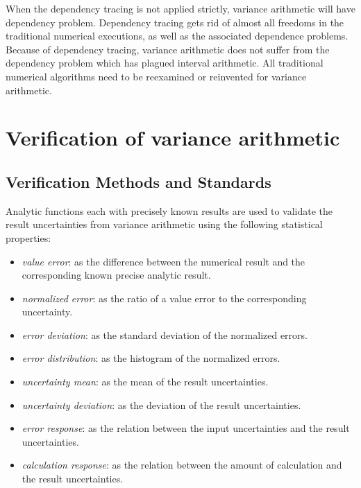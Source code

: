 \documentclass[twoside]{article}
\numberwithin{equation}{section}
\begin{document}
When the dependency tracing is not applied strictly, variance arithmetic will have dependency problem.
Dependency tracing gets rid of almost all freedoms in the traditional numerical executions, as well as the associated dependence problems.
Because of dependency tracing, variance arithmetic does not suffer from the dependency problem \cite{Interval_Arithmetic} which has plagued interval arithmetic.
All traditional numerical algorithms need to be reexamined or reinvented for variance arithmetic.








\clearpage
\section{Verification of variance arithmetic}
\label{sec: validation}

\subsection{Verification Methods and Standards}

Analytic functions each with precisely known results are used to validate the result uncertainties from variance arithmetic using the following statistical properties: 
\begin{itemize}

\item \emph{value error}: as the difference between the numerical result and the corresponding known precise analytic result.

\item \emph{normalized error}: as the ratio of a value error to the corresponding uncertainty.

\item \emph{error deviation}: as the standard deviation of the normalized errors.

\item \emph{error distribution}: as the histogram of the normalized errors.

\item \emph{uncertainty mean}: as the mean of the result uncertainties.

\item \emph{uncertainty deviation}: as the deviation of the result uncertainties.

\item \emph{error response}: as the relation between the input uncertainties and the result uncertainties.

\item \emph{calculation response}: as the relation between the amount of calculation and the result uncertainties.

\end{itemize}
\end{document}
